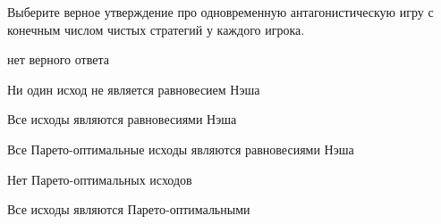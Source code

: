 
\begin{question}
Выберите верное утверждение про одновременную антагонистическую игру с
конечным числом чистых стратегий у каждого игрока.
\begin{answerlist}
  \item нет верного ответа
  \item Ни один исход не является равновесием Нэша
  \item Все исходы являются равновесиями Нэша
  \item Все Парето-оптимальные исходы являются равновесиями Нэша
  \item Нет Парето-оптимальных исходов
  \item Все исходы являются Парето-оптимальными
\end{answerlist}
\end{question}


